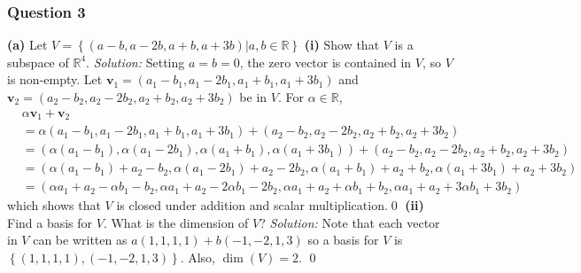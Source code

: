\documentclass{article}
\begin{document}
\subsubsection*{Question 3}
\textbf{(a)} Let $V=\left\{(a-b,a-2b,a+b,a+3b)|a,b\in\mathbb{R}\right\}$
\newline
\newline\textbf{(i)} Show that $V$ is a subspace of $\mathbb{R}^4$.
\newline
\newline\textit{Solution:} Setting $a=b=0$, the zero vector is contained in $V$, so $V$ is non-empty.
\newline
\newline Let $\mathbf{v}_1=(a_1-b_1,a_1-2b_1,a_1+b_1,a_1+3b_1)$ and $\mathbf{v}_2=(a_2-b_2,a_2-2b_2,a_2+b_2,a_2+3b_2)$ be in $V$. For $\alpha\in\mathbb{R}$, 	\begin{align*}
 & \alpha {{\mathbf{v}}_{1}}+{{\mathbf{v}}_{2}} \\
 &=\alpha \left( {{a}_{1}}-{{b}_{1}},{{a}_{1}}-2{{b}_{1}},{{a}_{1}}+{{b}_{1}},{{a}_{1}}+3{{b}_{1}} \right)+\left( {{a}_{2}}-{{b}_{2}},{{a}_{2}}-2{{b}_{2}},{{a}_{2}}+{{b}_{2}},{{a}_{2}}+3{{b}_{2}} \right)\\
 &=\left( \alpha \left( {{a}_{1}}-{{b}_{1}} \right),\alpha \left( {{a}_{1}}-2{{b}_{1}} \right),\alpha \left( {{a}_{1}}+{{b}_{1}} \right),\alpha \left( {{a}_{1}}+3{{b}_{1}} \right) \right)+\left( {{a}_{2}}-{{b}_{2}},{{a}_{2}}-2{{b}_{2}},{{a}_{2}}+{{b}_{2}},{{a}_{2}}+3{{b}_{2}} \right)\\
 &=\left( \alpha \left( {{a}_{1}}-{{b}_{1}} \right)+{{a}_{2}}-{{b}_{2}},\alpha \left( {{a}_{1}}-2{{b}_{1}} \right)+{{a}_{2}}-2{{b}_{2}},\alpha \left( {{a}_{1}}+{{b}_{1}} \right)+{{a}_{2}}+{{b}_{2}},\alpha \left( {{a}_{1}}+3{{b}_{1}} \right)+{{a}_{2}}+3{{b}_{2}} \right)\\
 &=(\alpha a_1+a_2-\alpha b_1-b_2,\alpha a_1+a_2-2\alpha b_1-2b_2,\alpha a_1+a_2+\alpha b_1+b_2,\alpha a_1+a_2+3\alpha b_1+3b_2) 
\end{align*}
which shows that $V$ is closed under addition and scalar multiplication.\qed
\newline
\newline\textbf{(ii)} Find a basis for $V$. What is the dimension of $V$?
\newline
\newline\textit{Solution:} Note that each vector in $V$ can be written as $a(1,1,1,1)+b(-1,-2,1,3)$ so a basis for $V$ is $\left\{(1,1,1,1),(-1,-2,1,3)\right\}$. Also, $\operatorname{dim}(V)=2$. \qed 
\end{document}

